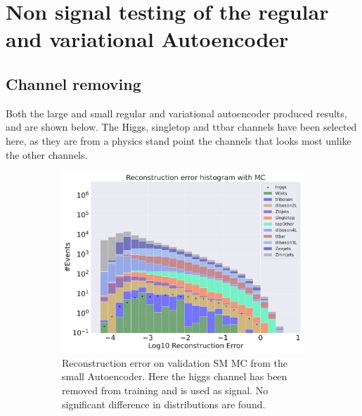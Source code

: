 \section{Non signal testing of the regular and variational Autoencoder}

\subsection*{Channel removing}

Both the large and small regular and variational autoencoder produced results, and are shown below. The Higgs, singletop and ttbar channels have been selected here, as they are 
from a physics stand point the channels that looks most unlike the other channels.  


\begin{figure}[h!]
    \centering
    \begin{subfigure}{.45\textwidth}
        \includegraphics[width=\textwidth]{Figures/AE_testing/small/b_data_recon_big_rm3_feats_sig_higgs.pdf}
        \caption{Reconstruction error on validation SM MC from the small Autoencoder. Here the higgs channel has been removed from training and 
        is used as signal. No significant difference in distributions are found.}
        \label{fig:ae_small_higgs}
    \end{subfigure}
    \hfill 
    \begin{subfigure}{.45\textwidth}

\end{subfigure}
\end{figure}
